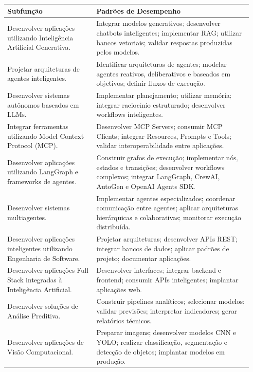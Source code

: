 \begin{table}[htb]
\centering
\small
\renewcommand{\arraystretch}{1.1}
\begin{tabular}{|p{6cm}|p{10cm}|}
\hline
\textbf{Subfunção} & \textbf{Padrões de Desempenho} \\
\hline
Desenvolver aplicações utilizando Inteligência Artificial Generativa. & Integrar modelos generativos; desenvolver chatbots inteligentes; implementar RAG; utilizar bancos vetoriais; validar respostas produzidas pelos modelos. \\
\hline
Projetar arquiteturas de agentes inteligentes. & Identificar arquiteturas de agentes; modelar agentes reativos, deliberativos e baseados em objetivos; definir fluxos de execução. \\
\hline
Desenvolver sistemas autônomos baseados em LLMs. & Implementar planejamento; utilizar memória; integrar raciocínio estruturado; desenvolver workflows inteligentes. \\
\hline
Integrar ferramentas utilizando Model Context Protocol (MCP). & Desenvolver MCP Servers; consumir MCP Clients; integrar Resources, Prompts e Tools; validar interoperabilidade entre aplicações. \\
\hline
Desenvolver aplicações utilizando LangGraph e frameworks de agentes. & Construir grafos de execução; implementar nós, estados e transições; desenvolver workflows complexos; integrar LangGraph, CrewAI, AutoGen e OpenAI Agents SDK. \\
\hline
Desenvolver sistemas multiagentes. & Implementar agentes especializados; coordenar comunicação entre agentes; aplicar arquiteturas hierárquicas e colaborativas; monitorar execução distribuída. \\
\hline
Desenvolver aplicações inteligentes utilizando Engenharia de Software. & Projetar arquiteturas; desenvolver APIs REST; integrar bancos de dados; aplicar padrões de projeto; documentar aplicações. \\
\hline
Desenvolver aplicações Full Stack integradas à Inteligência Artificial. & Desenvolver interfaces; integrar backend e frontend; consumir APIs inteligentes; implantar aplicações web. \\
\hline
Desenvolver soluções de Análise Preditiva. & Construir pipelines analíticos; selecionar modelos; validar previsões; interpretar indicadores; gerar relatórios técnicos. \\
\hline
Desenvolver aplicações de Visão Computacional. & Preparar imagens; desenvolver modelos CNN e YOLO; realizar classificação, segmentação e detecção de objetos; implantar modelos em produção. \\

\end{tabular}
\end{table}
